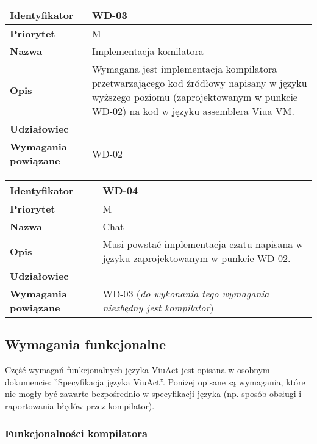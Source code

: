 \documentclass[11pt,oneside,a4paper,titlepage,onecolumn]{article}
\begin{document}
\vspace{1em}

\begin{tabular}{ | l | l | }
    \hline
    \textbf{Identyfikator} & \parbox[t]{11cm}{WD-03} \\
    \hline
    \textbf{Priorytet} & M \\
    \hline
    \textbf{Nazwa} & Implementacja komilatora \\
    \hline
    \textbf{Opis} & \parbox[t]{11cm}{
        Wymagana jest implementacja kompilatora przetwarzającego kod źródłowy napisany w języku
        wyższego poziomu (zaprojektowanym w punkcie WD-02) na kod w języku assemblera Viua VM.
    } \\
    \hline
    \textbf{Udziałowiec} & \phantom{} \\
    \hline
    \textbf{Wymagania powiązane} & WD-02 \\
    \hline
\end{tabular}

\vspace{1em}

\begin{tabular}{ | l | l | }
    \hline
    \textbf{Identyfikator} & \parbox[t]{11cm}{WD-04} \\
    \hline
    \textbf{Priorytet} & M \\
    \hline
    \textbf{Nazwa} & Chat \\
    \hline
    \textbf{Opis} & \parbox[t]{11cm}{
        Musi powstać implementacja czatu napisana w języku zaprojektowanym w punkcie WD-02.
    } \\
    \hline
    \textbf{Udziałowiec} & \phantom{} \\
    \hline
    \textbf{Wymagania powiązane} & \parbox[t]{11cm}{
        WD-03 (\emph{do wykonania tego wymagania niezbędny jest kompilator})
    } \\
    \hline
\end{tabular}

\subsection{Wymagania funkcjonalne}

Część wymagań funkcjonalnych języka ViuAct jest opisana w osobnym dokumencie: ''Specyfikacja języka ViuAct''.
Poniżej opisane są wymagania, które nie mogły być zawarte bezpośrednio w specyfikacji języka (np. sposób
obsługi i raportowania błędów przez kompilator).

\subsubsection{Funkcjonalności kompilatora}
\end{document}
